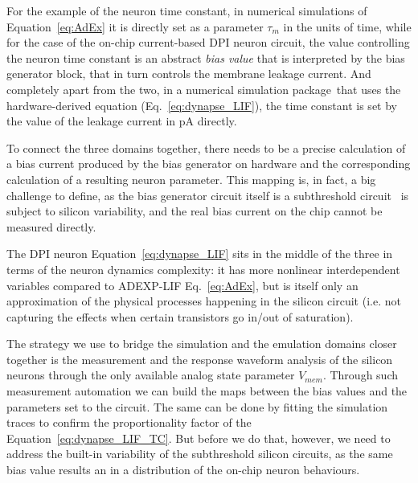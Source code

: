 For the example of the neuron time constant, in numerical simulations of Equation~\ref{eq:AdEx} it is directly set as a parameter $\tau_m$ in the units of time, while for the case of the on-chip current-based DPI neuron circuit, the value controlling the neuron time constant is an abstract \emph{bias value} that is interpreted by the bias generator block, that in turn controls the membrane leakage current.
And completely apart from the two, in a numerical simulation package~\cite{Milde_etal18}that uses the hardware-derived equation (Eq.~\ref{eq:dynapse_LIF}), the time constant is set by the value of the leakage current in pA directly.

To connect the three domains together, there needs to be a precise calculation of a bias current produced by the bias generator on hardware and the corresponding calculation of a resulting neuron parameter. This mapping is, in fact, a big challenge to define, as the bias generator circuit itself is a subthreshold circuit~\cite{Delbruck_etal10} is subject to silicon variability, and the real bias current on the chip cannot be measured directly.

The DPI neuron Equation~\ref{eq:dynapse_LIF} sits in the middle of the three in terms of the neuron dynamics complexity: it has more nonlinear interdependent variables compared to \ac{ADEXP-LIF} Eq.~\ref{eq:AdEx}, but is itself only an approximation of the physical processes happening in the silicon circuit (i.e. not capturing the effects when certain transistors go in/out of saturation).

The strategy we use to bridge the simulation and the emulation domains closer together is the measurement and the response waveform analysis of the silicon neurons through the only available analog state parameter $V_{mem}$. Through such measurement automation we can build the maps between the bias values and the parameters set to the circuit. The same can be done by fitting the simulation traces to confirm the proportionality factor of the Equation~\ref{eq:dynapse_LIF_TC}. But before we do that, however, we need to address the built-in variability of the subthreshold silicon circuits, as the same bias value results an in a distribution of the on-chip neuron behaviours.



